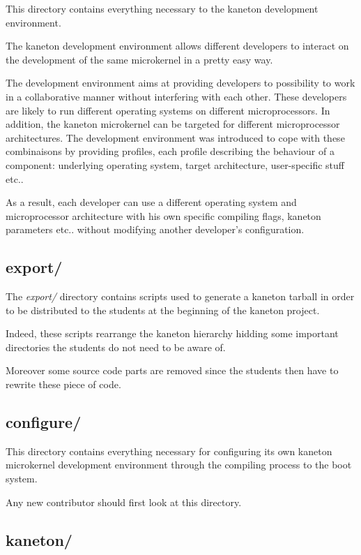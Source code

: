 This directory contains everything necessary to the kaneton development
environment.

The kaneton development environment allows different developers to
interact on the development of the same microkernel in a pretty easy way.

The development environment aims at providing developers to possibility to
work in a collaborative manner without interfering with each other. These
developers are likely to run different operating systems on different
microprocessors. In addition, the kaneton microkernel can be targeted for
different microprocessor architectures. The development environment was
introduced to cope with these combinaisons by providing profiles, each
profile describing the behaviour of a component: underlying operating system,
target architecture, user-specific stuff etc..

As a result, each developer can use a different operating system and
microprocessor architecture with his own specific compiling flags, kaneton
parameters etc.. without modifying another developer's configuration.


\subsection*{export/}

The \textit{export/} directory contains scripts used to generate a kaneton
tarball in order to be distributed to the students at the beginning of the
kaneton project.

Indeed, these scripts rearrange the kaneton hierarchy hidding some
important directories the students do not need to be aware of.

Moreover some source code parts are removed since the students then have to
rewrite these piece of code.


\subsection*{configure/}

This directory contains everything necessary for configuring its own
kaneton microkernel development environment through the compiling process
to the boot system.

Any new contributor should first look at this directory.


\subsection*{kaneton/}

